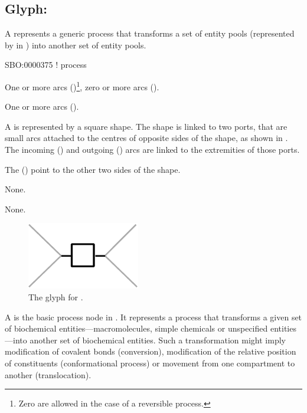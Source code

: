 \subsection{Glyph: }
\label{sec:process}

A  represents a generic process that transforms a set of entity pools (represented by  in \SBGNPDLone) into another set of entity pools.

\begin{glyphDescription}

\glyphSboTerm
SBO:0000375 ! process

\glyphIncoming
One or more  arcs ()\footnote{Zero  are allowed in the case of a reversible process.}, zero or more  arcs ().

\glyphOutgoing
One or more  arcs ().

\glyphContainer
A  is represented by a square shape.
The shape is linked to two ports, that are small arcs attached to the centres of opposite sides of the shape, as shown in .
The incoming  () and outgoing  () arcs are linked to the extremities of those ports.

The  () point to the other two sides of the shape.

\glyphLabel
None.

\glyphAux
None.

\end{glyphDescription}

\begin{figure}[H]
  \centering
  \includegraphics{images/build/process.pdf}
  \caption{The \PD glyph for .}
  \label{fig:process}
\end{figure}

A  is the basic process node in \PD.  It represents a process that transforms a given set of biochemical entities---macromolecules, simple chemicals or unspecified entities---into another set of biochemical entities.  Such a transformation might imply modification of covalent bonds (conversion), modification of the relative position of constituents (conformational process) or movement from one compartment to another (translocation).

